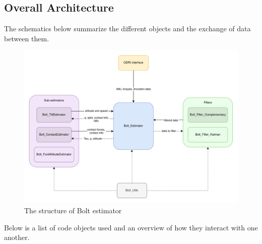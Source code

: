 \documentclass[a4paper,10pt]{article}
\begin{document}
\subsection{Overall Architecture}
The schematics below summarize the different objects and the exchange of data between them.
\begin{figure}[H]
\centering
  \includegraphics[width=\linewidth, angle=0, scale=1.1]{./images/Structure_simple.png}
  \caption{The structure of Bolt estimator}
\end{figure}

Below is a list of code objects used and an overview of how they interact with one another.
\end{document}
